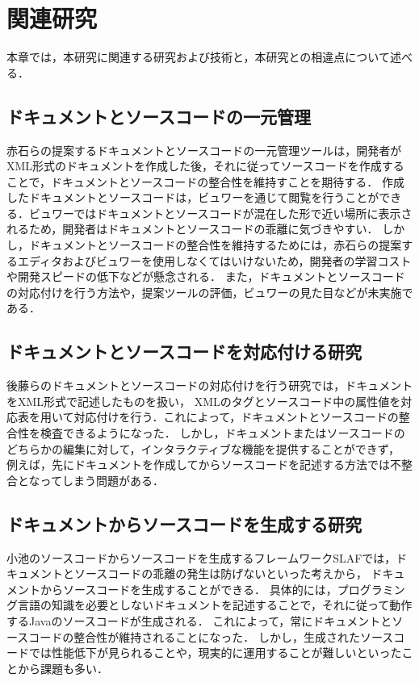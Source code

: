 \chapter{関連研究}
本章では，本研究に関連する研究および技術と，本研究との相違点について述べる．

\section{ドキュメントとソースコードの一元管理}
赤石らの提案するドキュメントとソースコードの一元管理ツールは，開発者がXML形式のドキュメントを作成した後，それに従ってソースコードを作成することで，ドキュメントとソースコードの整合性を維持すことを期待する．
作成したドキュメントとソースコードは，ビュワーを通じて閲覧を行うことができる．ビュワーではドキュメントとソースコードが混在した形で近い場所に表示されるため，開発者はドキュメントとソースコードの乖離に気づきやすい．
しかし，ドキュメントとソースコードの整合性を維持するためには，赤石らの提案するエディタおよびビュワーを使用しなくてはいけないため，開発者の学習コストや開発スピードの低下などが懸念される．
また，ドキュメントとソースコードの対応付けを行う方法や，提案ツールの評価，ビュワーの見た目などが未実施である．

\section{ドキュメントとソースコードを対応付ける研究}
後藤らのドキュメントとソースコードの対応付けを行う研究\cite{taiouduke}では，ドキュメントをXML形式で記述したものを扱い，
XMLのタグとソースコード中の属性値を対応表を用いて対応付けを行う．これによって，ドキュメントとソースコードの整合性を検査できるようになった．
しかし，ドキュメントまたはソースコードのどちらかの編集に対して，インタラクティブな機能を提供することができず，
例えば，先にドキュメントを作成してからソースコードを記述する方法では不整合となってしまう問題がある．

\section{ドキュメントからソースコードを生成する研究}
小池のソースコードからソースコードを生成するフレームワークSLAF\cite{framework}では，ドキュメントとソースコードの乖離の発生は防げないといった考えから，
ドキュメントからソースコードを生成することができる．
具体的には，プログラミング言語の知識を必要としないドキュメントを記述することで，それに従って動作するJavaのソースコードが生成される．
これによって，常にドキュメントとソースコードの整合性が維持されることになった．
しかし，生成されたソースコードでは性能低下が見られることや，現実的に運用することが難しいといったことから課題も多い．

